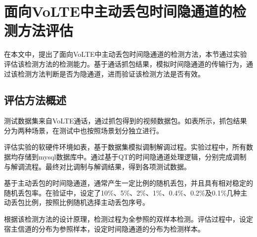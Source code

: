 \section{面向VoLTE中主动丢包时间隐通道的检测方法评估}
\label{chap:analyze:result}

在本文中，提出了面向VoLTE中主动丢包时间隐通道的检测方法，本节通过实验评估该检测方法的检测能力。基于通话抓包结果，模拟时间隐通道的传输行为，通过该检测方法判断是否为隐通道，进而验证该检测方法是否有效。

\subsection{评估方法概述}
\label{chap:analyze:result:abstract}

测试数据集来自VoLTE通话，通过抓包得到的视频数据包。如表所示，抓包结果分为两种场景，在测试中也按照场景划分独立进行。


评估实验的软硬件环境如表，基于数据集模拟调制解调过程。实验过程中，所有数据均存储到mysql数据库中。通过基于QT的时间隐通道处理逻辑，分别完成调制与解调流程。最终对比调制与解调结果，得到各项测试数据。

基于主动丢包的时间隐通道，通常产生一定比例的随机丢包，并且具有相对稳定的随机丢包率。在验证中，设定了10\%、5\%、2\%、1\%、0.4\%、0.2\%及0.1\%几种主动丢包比例，按照比例随机选择主动丢包序号。

根据该检测方法的设计原理，检测过程为全参照的双样本检测。评估过程中，设定宿主信道的分布为参照样本，设定时间隐通道的分布为检测样本。

